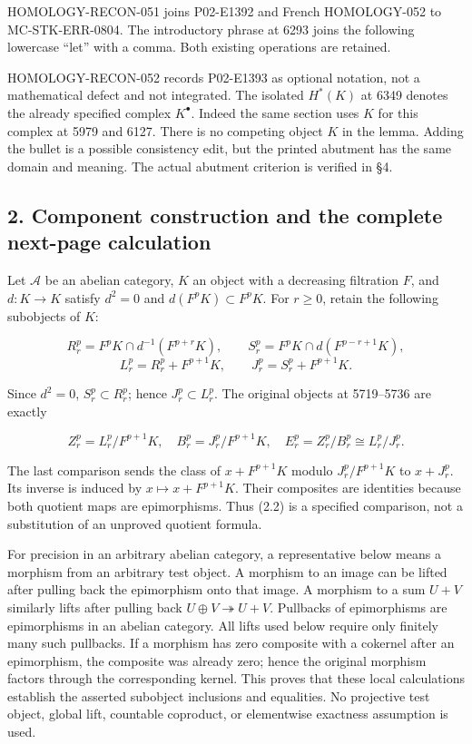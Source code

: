 \documentclass[11pt]{article}
\begin{document}
HOMOLOGY-RECON-051 joins P02-E1392 and French HOMOLOGY-052 to MC-STK-ERR-0804. The introductory phrase at 6293 joins the following lowercase ``let'' with a comma. Both existing operations are retained.

HOMOLOGY-RECON-052 records P02-E1393 as optional notation, not a mathematical defect and not integrated. The isolated \(H^*(K)\) at 6349 denotes the already specified complex \(K^\bullet\). Indeed the same section uses \(K\) for this complex at 5979 and 6127. There is no competing object \(K\) in the lemma. Adding the bullet is a possible consistency edit, but the printed abutment has the same domain and meaning. The actual abutment criterion is verified in §4.

\subsection{2. Component construction and the complete next-page calculation}\label{note-06-component-construction-and-the-complete-next-page-calculation}

Let \(\mathcal A\) be an abelian category, \(K\) an object with a decreasing filtration \(F\), and \(d:K\to K\) satisfy \(d^2=0\) and \(d(F^pK)\subset F^pK\). For \(r\geq0\), retain the following subobjects of \(K\):

\[
R_r^p=F^pK\cap d^{-1}(F^{p+r}K),\qquad
S_r^p=F^pK\cap d(F^{p-r+1}K),
\] \[
L_r^p=R_r^p+F^{p+1}K,\qquad
J_r^p=S_r^p+F^{p+1}K.                 \tag{2.1}
\]

Since \(d^2=0\), \(S_r^p\subset R_r^p\); hence \(J_r^p\subset L_r^p\). The original objects at 5719--5736 are exactly

\[
Z_r^p=L_r^p/F^{p+1}K,\quad B_r^p=J_r^p/F^{p+1}K,\quad
E_r^p=Z_r^p/B_r^p\cong L_r^p/J_r^p.       \tag{2.2}
\]

The last comparison sends the class of \(x+F^{p+1}K\) modulo \(J_r^p/F^{p+1}K\) to \(x+J_r^p\). Its inverse is induced by \(x\mapsto x+F^{p+1}K\). Their composites are identities because both quotient maps are epimorphisms. Thus (2.2) is a specified comparison, not a substitution of an unproved quotient formula.

For precision in an arbitrary abelian category, a representative below means a morphism from an arbitrary test object. A morphism to an image can be lifted after pulling back the epimorphism onto that image. A morphism to a sum \(U+V\) similarly lifts after pulling back \(U\oplus V\twoheadrightarrow U+V\). Pullbacks of epimorphisms are epimorphisms in an abelian category. All lifts used below require only finitely many such pullbacks. If a morphism has zero composite with a cokernel after an epimorphism, the composite was already zero; hence the original morphism factors through the corresponding kernel. This proves that these local calculations establish the asserted subobject inclusions and equalities. No projective test object, global lift, countable coproduct, or elementwise exactness assumption is used.
\end{document}

